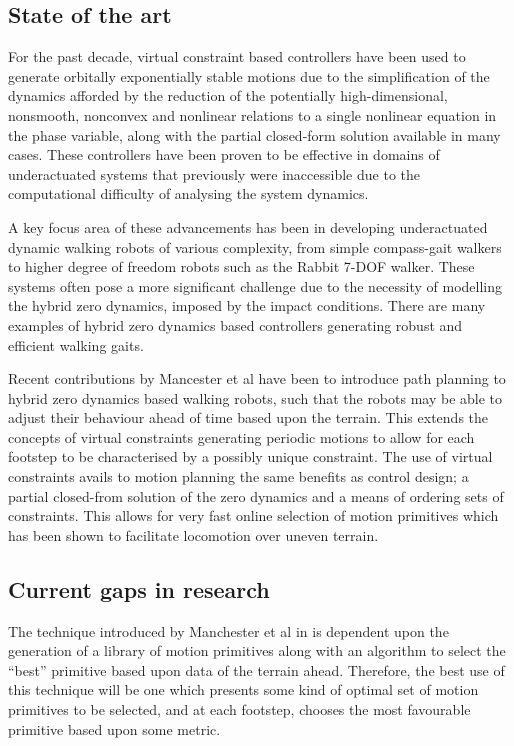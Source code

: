 \subsection{State of the art}
For the past decade, virtual constraint based controllers have been used to generate orbitally exponentially stable motions due to the simplification of the dynamics afforded by the reduction of the potentially high-dimensional, nonsmooth, nonconvex and  nonlinear relations to a single nonlinear equation in the phase variable, along with the partial closed-form solution available in many cases. These controllers have been proven to be effective in domains of underactuated systems that previously were inaccessible due to the computational difficulty of analysing the system dynamics. 

A key focus area of these advancements has been in developing underactuated dynamic walking robots of various complexity, from simple compass-gait walkers to higher degree of freedom robots such as the Rabbit 7-DOF walker. These systems often pose a more significant challenge due to the necessity of modelling the hybrid zero dynamics, imposed by the impact conditions. There are many examples of hybrid zero dynamics based controllers generating robust and efficient walking gaits. 

Recent contributions by Mancester et al have been to introduce path planning to hybrid zero dynamics based walking robots, such that the robots may be able to adjust their behaviour ahead of time based upon the terrain. This extends the concepts of virtual constraints generating periodic motions to allow for each footstep to be characterised by a possibly unique constraint. The use of virtual constraints avails to motion planning the same benefits as control design; a partial closed-from solution of the zero dynamics and a means of ordering sets of constraints. This allows for very fast online selection of motion primitives which has been shown to facilitate locomotion over uneven terrain.

\subsection{Current gaps in research}
The technique introduced by Manchester et al in \cite{manchester13planning} is dependent upon the generation of a library of motion primitives along with an algorithm to select the ``best'' primitive based upon data of the terrain ahead. Therefore, the best use of this technique will be one which presents some kind of optimal set of motion primitives to be selected, and at each footstep, chooses the most favourable primitive based upon some metric. 

